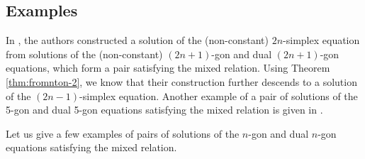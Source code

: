\documentclass[pdftex]{sigma}
\numberwithin{equation}{section}
\theoremstyle{definition}
\begin{document}
\subsection{Examples}

In \cite{dimakis2021grassmannian}, the authors constructed a solution of the (non-constant) $2n$-simplex equation from solutions of the (non-constant) $(2n+1)$-gon and dual $(2n+1)$-gon equations, which form a pair satisfying the mixed relation. Using Theorem \ref{thm:fromnton-2}, we know that their construction further descends to a solution of the $(2n-1)$-simplex equation. Another example of a pair of solutions of the 5-gon and dual 5-gon equations satisfying the mixed relation is given in \cite{evripidou2024quadrirational}.

Let us give a few examples of pairs of solutions of the $n$-gon and dual $n$-gon equations satisfying the mixed relation.
\end{document}
